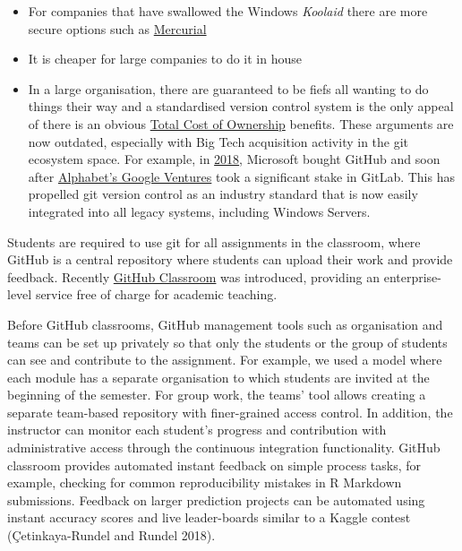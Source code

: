 \documentclass{article}
\begin{document}
\begin{itemize}
\tightlist
\item
  For companies that have swallowed the Windows \emph{Koolaid} there are
  more secure options such as
  \href{https://www.mercurial-scm.org/}{Mercurial}
\item
  It is cheaper for large companies to do it in house
\item
  In a large organisation, there are guaranteed to be fiefs all wanting
  to do things their way and a standardised version control system is
  the only appeal of there is an obvious
  \href{https://www.investopedia.com/terms/t/totalcostofownership.asp}{Total
  Cost of Ownership} benefits. These arguments are now outdated,
  especially with Big Tech acquisition activity in the git ecosystem
  space. For example, in
  \href{https://www.bloomberg.com/news/articles/2018-06-03/microsoft-is-said-to-have-agreed-to-acquire-coding-site-github}{2018},
  Microsoft bought GitHub and soon after
  \href{https://www.bloomberg.com/news/articles/2018-09-19/alphabet-backs-gitlab-s-quest-to-surpass-microsoft-s-github}{Alphabet's
  Google Ventures} took a significant stake in GitLab. This has
  propelled git version control as an industry standard that is now
  easily integrated into all legacy systems, including Windows Servers.
\end{itemize}

Students are required to use git for all assignments in the classroom,
where GitHub is a central repository where students can upload their
work and provide feedback. Recently
\href{https://classroom.github.com/}{GitHub Classroom} was introduced,
providing an enterprise-level service free of charge for academic
teaching.

Before GitHub classrooms, GitHub management tools such as organisation
and teams can be set up privately so that only the students or the group
of students can see and contribute to the assignment. For example, we
used a model where each module has a separate organisation to which
students are invited at the beginning of the semester. For group work,
the teams' tool allows creating a separate team-based repository with
finer-grained access control. In addition, the instructor can monitor
each student's progress and contribution with administrative access
through the continuous integration functionality. GitHub classroom
provides automated instant feedback on simple process tasks, for
example, checking for common reproducibility mistakes in R Markdown
submissions. Feedback on larger prediction projects can be automated
using instant accuracy scores and live leader-boards similar to a Kaggle
contest (Çetinkaya-Rundel and Rundel 2018).
\end{document}
